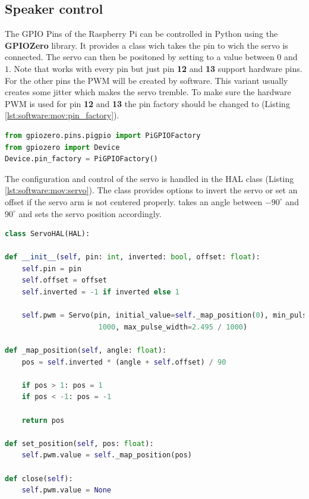 \subsection{Speaker control}

The GPIO Pins of the Raspberry Pi can be controlled in Python using the \textbf{GPIOZero} library. It provides a class  wich takes the pin to wich the servo is connected. The servo can then be positoned by setting  to a value between $0$ and $1$. Note that  works with every pin but just pin \textbf{12} and \textbf{13} support hardware pins. For the other pins the PWM will be created by software. This variant usually creates some jitter which makes the servo tremble. To make sure the hardware PWM is used for pin \textbf{12} and \textbf{13} the pin factory should be changed to  (Listing \ref{lst:software:mov:pin_factory}).\cite{nuttall_gpio_2021}
%
\begin{mdframed}
\begin{lstlisting}[language=Python, caption=Changing the pin factory, label=lst:software:mov:pin_factory]
from gpiozero.pins.pigpio import PiGPIOFactory
from gpiozero import Device
Device.pin_factory = PiGPIOFactory()
\end{lstlisting}
\end{mdframed}
%
The configuration and control of the servo is handled in the HAL class  (Listing \ref{lst:software:mov:servo}). The class provides options to invert the servo or set an offset if the servo arm is not centered properly.  takes an angle between $-90^\circ$ and $90^\circ$ and sets the servo position accordingly.
%
\begin{mdframed}
\begin{lstlisting}[language=Python, caption=Servo configuration and control, label=lst:software:mov:servo]
class ServoHAL(HAL):

def __init__(self, pin: int, inverted: bool, offset: float):
    self.pin = pin
    self.offset = offset
    self.inverted = -1 if inverted else 1

    self.pwm = Servo(pin, initial_value=self._map_position(0), min_pulse_width=0.615 /
                      1000, max_pulse_width=2.495 / 1000)

def _map_position(self, angle: float):
    pos = self.inverted * (angle + self.offset) / 90

    if pos > 1: pos = 1
    if pos < -1: pos = -1

    return pos

def set_position(self, pos: float):
    self.pwm.value = self._map_position(pos)

def close(self):
    self.pwm.value = None
\end{lstlisting}
\end{mdframed}
